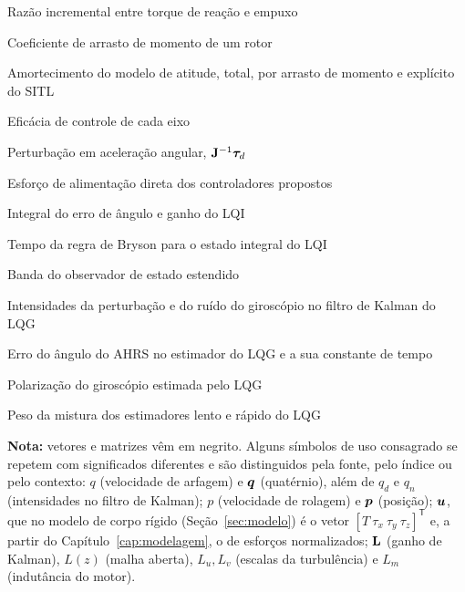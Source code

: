 \begin{simbolos}
    \item[$\kappa'$] Razão incremental entre torque de reação e empuxo
    \item[$k_{md}$] Coeficiente de arrasto de momento de um rotor
    \item[$a$, $a_{md}$, $a_r$] Amortecimento do modelo de atitude, total,
        por arrasto de momento e explícito do SITL
    \item[$b_x, b_y, b_z$] Eficácia de controle de cada eixo
    \item[$\vetor{d}$] Perturbação em aceleração angular,
        $\mathbf{J}^{-1}\bm{\tau}_d$
    \item[$u_{ff}$] Esforço de alimentação direta dos controladores propostos
    \item[$x_I$, $k_i$] Integral do erro de ângulo e ganho do LQI
    \item[$T_I$] Tempo da regra de Bryson para o estado integral do LQI
    \item[$\omega_o$] Banda do observador de estado estendido
    \item[$q_d$, $q_n$] Intensidades da perturbação e do ruído do giroscópio
        no filtro de Kalman do LQG
    \item[$\eta$, $\tau_c$] Erro do ângulo do AHRS no estimador do LQG e a sua
        constante de tempo
    \item[$b_g$] Polarização do giroscópio estimada pelo LQG
    \item[$\alpha$] Peso da mistura dos estimadores lento e rápido do LQG
\end{simbolos}

\vspace{\baselineskip}
\noindent\textbf{Nota:} vetores e matrizes vêm em negrito. Alguns símbolos de uso consagrado
se repetem com significados diferentes e são distinguidos pela fonte, pelo
índice ou pelo contexto: $q$ (velocidade de arfagem) e $\bm{q}$ (quatérnio),
além de $q_d$ e $q_n$ (intensidades no filtro de Kalman); $p$ (velocidade de
rolagem) e $\bm{p}$ (posição); $\bm{u}$, que no modelo de corpo rígido
(Seção~\ref{sec:modelo}) é o vetor $[T\ \tau_x\ \tau_y\ \tau_z]^{\mathsf{T}}$
e, a partir do Capítulo~\ref{cap:modelagem}, o de esforços normalizados;
$\mathbf{L}$ (ganho de Kalman), $L(z)$ (malha aberta), $L_u, L_v$ (escalas da
turbulência) e $L_m$ (indutância do motor).

